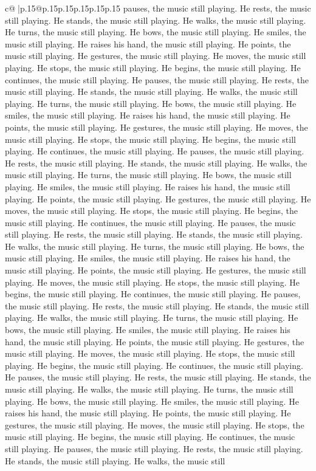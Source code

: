 \documentclass{article}
\begin{document}
{\begin{supertabular}{c@{$\;$}|p{.15\linewidth}@{}p{.15\linewidth}p{.15\linewidth}p{.15\linewidth}p{.15\linewidth}p{.15\linewidth}}
{{{pauses, the music still playing. He rests, the music still playing. He stands, the music still playing. He walks, the music still playing. He turns, the music still playing. He bows, the music still playing. He smiles, the music still playing. He raises his hand, the music still playing. He points, the music still playing. He gestures, the music still playing. He moves, the music still playing. He stops, the music still playing. He begins, the music still playing. He continues, the music still playing. He pauses, the music still playing. He rests, the music still playing. He stands, the music still playing. He walks, the music still playing. He turns, the music still playing. He bows, the music still playing. He smiles, the music still playing. He raises his hand, the music still playing. He points, the music still playing. He gestures, the music still playing. He moves, the music still playing. He stops, the music still playing. He begins, the music still playing. He continues, the music still playing. He pauses, the music still playing. He rests, the music still playing. He stands, the music still playing. He walks, the music still playing. He turns, the music still playing. He bows, the music still playing. He smiles, the music still playing. He raises his hand, the music still playing. He points, the music still playing. He gestures, the music still playing. He moves, the music still playing. He stops, the music still playing. He begins, the music still playing. He continues, the music still playing. He pauses, the music still playing. He rests, the music still playing. He stands, the music still playing. He walks, the music still playing. He turns, the music still playing. He bows, the music still playing. He smiles, the music still playing. He raises his hand, the music still playing. He points, the music still playing. He gestures, the music still playing. He moves, the music still playing. He stops, the music still playing. He begins, the music still playing. He continues, the music still playing. He pauses, the music still playing. He rests, the music still playing. He stands, the music still playing. He walks, the music still playing. He turns, the music still playing. He bows, the music still playing. He smiles, the music still playing. He raises his hand, the music still playing. He points, the music still playing. He gestures, the music still playing. He moves, the music still playing. He stops, the music still playing. He begins, the music still playing. He continues, the music still playing. He pauses, the music still playing. He rests, the music still playing. He stands, the music still playing. He walks, the music still playing. He turns, the music still playing. He bows, the music still playing. He smiles, the music still playing. He raises his hand, the music still playing. He points, the music still playing. He gestures, the music still playing. He moves, the music still playing. He stops, the music still playing. He begins, the music still playing. He continues, the music still playing. He pauses, the music still playing. He rests, the music still playing. He stands, the music still playing. He walks, the music still }}}
\end{supertabular}}
\end{document}

